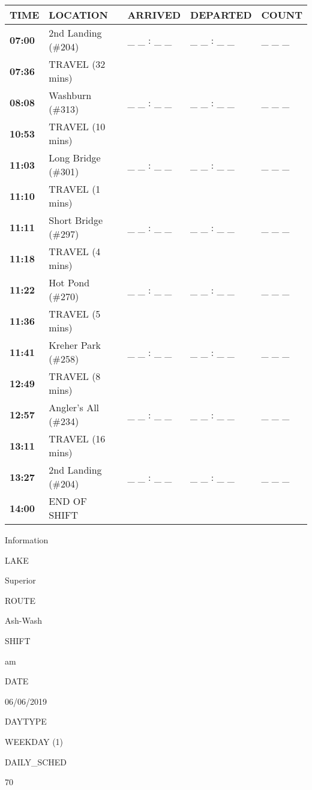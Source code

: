 \documentclass[]{article}
\begin{document}
\begin{tabular}{>{\bfseries}lllll}
\toprule
\textbf{TIME} & \textbf{LOCATION} & \textbf{ARRIVED} & \textbf{DEPARTED} & \textbf{COUNT}\\
\midrule
07:00 & 2nd Landing (\#204) & \_ \_ : \_ \_ & \_ \_ : \_ \_ & \_ \_ \_\\
07:36 & TRAVEL (32 mins) &  &  & \\
08:08 & Washburn (\#313) & \_ \_ : \_ \_ & \_ \_ : \_ \_ & \_ \_ \_\\
10:53 & TRAVEL (10 mins) &  &  & \\
11:03 & Long Bridge (\#301) & \_ \_ : \_ \_ & \_ \_ : \_ \_ & \_ \_ \_\\
11:10 & TRAVEL (1 mins) &  &  & \\
11:11 & Short Bridge (\#297) & \_ \_ : \_ \_ & \_ \_ : \_ \_ & \_ \_ \_\\
11:18 & TRAVEL (4 mins) &  &  & \\
11:22 & Hot Pond (\#270) & \_ \_ : \_ \_ & \_ \_ : \_ \_ & \_ \_ \_\\
11:36 & TRAVEL (5 mins) &  &  & \\
11:41 & Kreher Park (\#258) & \_ \_ : \_ \_ & \_ \_ : \_ \_ & \_ \_ \_\\
12:49 & TRAVEL (8 mins) &  &  & \\
12:57 & Angler's All (\#234) & \_ \_ : \_ \_ & \_ \_ : \_ \_ & \_ \_ \_\\
13:11 & TRAVEL (16 mins) &  &  & \\
13:27 & 2nd Landing (\#204) & \_ \_ : \_ \_ & \_ \_ : \_ \_ & \_ \_ \_\\
14:00 & END OF SHIFT &  &  & \\
\bottomrule
\end{tabular}\newpage

Information

LAKE

Superior

ROUTE

Ash-Wash

SHIFT

am

DATE

06/06/2019

DAYTYPE

WEEKDAY (1)

DAILY\_SCHED

70

\vspace{24pt}
\end{document}
